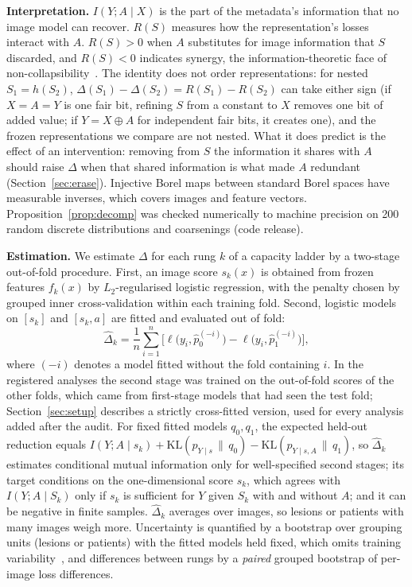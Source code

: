 \documentclass[conference]{IEEEtran}
\begin{document}
\textbf{Interpretation.} $I(Y;A\mid X)$ is the part of the metadata's information that no image model can recover. $R(S)$ measures how the representation's losses interact with $A$. $R(S)>0$ when $A$ substitutes for image information that $S$ discarded, and $R(S)<0$ indicates synergy, the information-theoretic face of non-collapsibility~\cite{gail1984}. The identity does not order representations: for nested $S_1=h(S_2)$, $\Delta(S_1)-\Delta(S_2)=R(S_1)-R(S_2)$ can take either sign (if $X=A=Y$ is one fair bit, refining $S$ from a constant to $X$ removes one bit of added value; if $Y=X\oplus A$ for independent fair bits, it creates one), and the frozen representations we compare are not nested. What it does predict is the effect of an intervention: removing from $S$ the information it shares with $A$ should raise $\Delta$ when that shared information is what made $A$ redundant (Section~\ref{sec:erase}). Injective Borel maps between standard Borel spaces have measurable inverses, which covers images and feature vectors. Proposition~\ref{prop:decomp} was checked numerically to machine precision on 200 random discrete distributions and coarsenings (code release).

\textbf{Estimation.} We estimate $\Delta$ for each rung $k$ of a capacity ladder by a two-stage out-of-fold procedure. First, an image score $s_k(x)$ is obtained from frozen features $f_k(x)$ by $L_2$-regularised logistic regression, with the penalty chosen by grouped inner cross-validation within each training fold. Second, logistic models on $[s_k]$ and $[s_k, a]$ are fitted and evaluated out of fold:
\begin{equation}
\hat\Delta_k=\frac1n\sum_{i=1}^{n}\Big[\ell\big(y_i,\hat p^{(-i)}_{0}\big)-\ell\big(y_i,\hat p^{(-i)}_{1}\big)\Big],\label{eq:est}
\end{equation}
where $(-i)$ denotes a model fitted without the fold containing $i$. In the registered analyses the second stage was trained on the out-of-fold scores of the other folds, which came from first-stage models that had seen the test fold; Section~\ref{sec:setup} describes a strictly cross-fitted version, used for every analysis added after the audit. For fixed fitted models $q_0,q_1$, the expected held-out reduction equals $I(Y;A\mid s_k)+\mathrm{KL}(p_{Y\mid s}\,\|\,q_0)-\mathrm{KL}(p_{Y\mid s,A}\,\|\,q_1)$, so $\hat\Delta_k$ estimates conditional mutual information only for well-specified second stages; its target conditions on the one-dimensional score $s_k$, which agrees with $I(Y;A\mid S_k)$ only if $s_k$ is sufficient for $Y$ given $S_k$ with and without $A$; and it can be negative in finite samples. $\hat\Delta_k$ averages over images, so lesions or patients with many images weigh more. Uncertainty is quantified by a bootstrap over grouping units (lesions or patients) with the fitted models held fixed, which omits training variability~\cite{bates2024cv}, and differences between rungs by a \emph{paired} grouped bootstrap of per-image loss differences.
\end{document}

